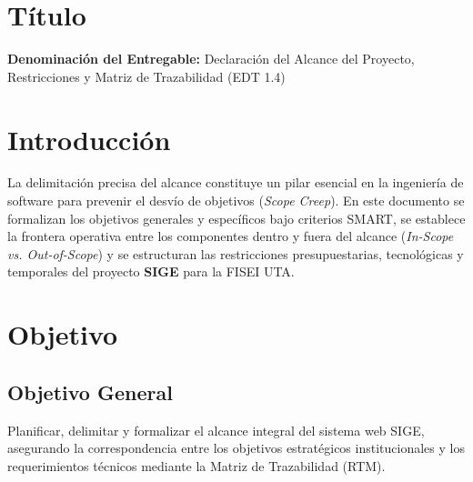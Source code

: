 \documentclass[12pt,a4paper]{article}
\begin{document}

\vspace{0.25cm}
\section{Título}
\textbf{Denominación del Entregable:} Declaración del Alcance del Proyecto, Restricciones y Matriz de Trazabilidad (EDT 1.4)



\section{Introducción}
La delimitación precisa del alcance constituye un pilar esencial en la ingeniería de software para prevenir el desvío de objetivos (\textit{Scope Creep}). En este documento se formalizan los objetivos generales y específicos bajo criterios SMART, se establece la frontera operativa entre los componentes dentro y fuera del alcance (\textit{In-Scope vs. Out-of-Scope}) y se estructuran las restricciones presupuestarias, tecnológicas y temporales del proyecto \textbf{SIGE} para la FISEI UTA.

\section{Objetivo}

\subsection{Objetivo General}
Planificar, delimitar y formalizar el alcance integral del sistema web SIGE, asegurando la correspondencia entre los objetivos estratégicos institucionales y los requerimientos técnicos mediante la Matriz de Trazabilidad (RTM).
\end{document}
